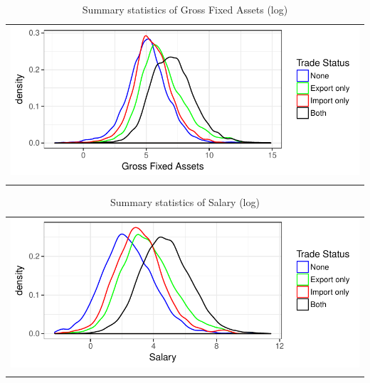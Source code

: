 \documentclass[11pt]{article}
\begin{document}
\begin{center}
\begin{table}[H]
\caption{Summary statistics of Gross Fixed Assets (log)}
\label{lgfa}
\begin{tabular}{c}
 \includegraphics{./PICS/denslgfa.pdf}   \\ 
   \\  
\end{tabular}
\end{table}
\end{center}
\begin{center}
\begin{table}[H]
\caption{Summary statistics of Salary (log)}
\label{tab:lsalary}
\begin{tabular}{c}
 \includegraphics{./PICS/denslsalary.pdf}   \\ 
   \\  
\end{tabular}
\end{table}
\end{center}
\end{document}
